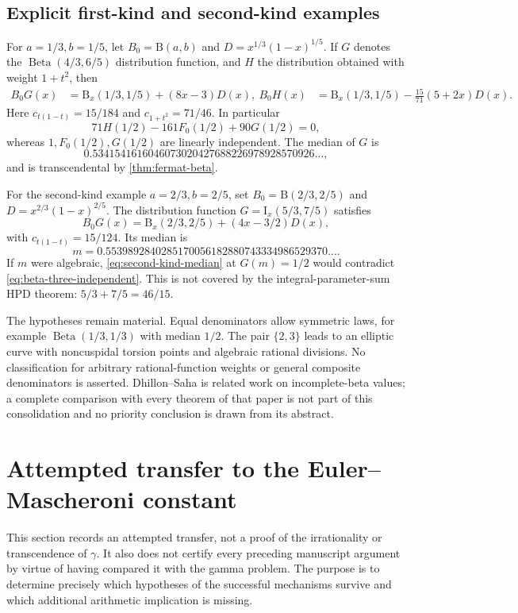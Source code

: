 \documentclass[11pt,a4paper]{article}
\numberwithin{equation}{section}
\theoremstyle{definition}
\theoremstyle{remark}
\newcommand{\B}{\mathrm B}
\begin{document}
\subsection{Explicit first-kind and second-kind examples}
For $a=1/3,b=1/5$, let $B_0=\B(a,b)$ and $D=x^{1/3}(1-x)^{1/5}$.
If $G$ denotes the $\operatorname{Beta}(4/3,6/5)$ distribution function,
and $H$ the distribution obtained with weight $1+t^2$, then
\begin{align}
 B_0G(x)&=\B_x(1/3,1/5)+(8x-3)D(x),\
 B_0H(x)&=\B_x(1/3,1/5)-\frac{15}{71}(5+2x)D(x).
\end{align}
Here $c_{t(1-t)}=15/184$ and $c_{1+t^2}=71/46$. In particular
\[
 71H(1/2)-161F_0(1/2)+90G(1/2)=0,
\]
whereas $1,F_0(1/2),G(1/2)$ are linearly independent. The median of $G$ is
\[
 0.5341541616046073020427688226978928570926\ldots,
\]
and is transcendental by \cref{thm:fermat-beta}.

For the second-kind example $a=2/3,b=2/5$, set
$B_0=\B(2/3,2/5)$ and $D=x^{2/3}(1-x)^{2/5}$. The distribution function
$G=\mathrm I_x(5/3,7/5)$ satisfies
\begin{equation}\label{eq:second-kind-median}
 B_0G(x)=\B_x(2/3,2/5)+(4x-3/2)D(x),
\end{equation}
with $c_{t(1-t)}=15/124$. Its median is
\begin{equation}
 m=0.5539892840285170056182880743334986529370\ldots.
\end{equation}
If $m$ were algebraic, \eqref{eq:second-kind-median} at $G(m)=1/2$
would contradict \eqref{eq:beta-three-independent}. This is not covered
by the integral-parameter-sum HPD theorem: $5/3+7/5=46/15$.

The hypotheses remain material. Equal denominators allow symmetric laws,
for example $\operatorname{Beta}(1/3,1/3)$ with median $1/2$.
The pair $\{2,3\}$ leads to an elliptic curve with noncuspidal torsion
points and algebraic rational divisions. No classification for arbitrary
rational-function weights or general composite denominators is asserted.
Dhillon--Saha \cite{DhillonSaha} is related work on incomplete-beta values;
a complete comparison with every theorem of that paper is not part of
this consolidation and no priority conclusion is drawn from its abstract.

\section{Attempted transfer to the Euler--Mascheroni constant}\label{sec:gamma}
This section records an attempted transfer, not a proof of the irrationality
or transcendence of $\gamma$. It also does not certify every preceding
manuscript argument by virtue of having compared it with the gamma problem.
The purpose is to determine precisely which hypotheses of the successful
mechanisms survive and which additional arithmetic implication is missing.
\end{document}
